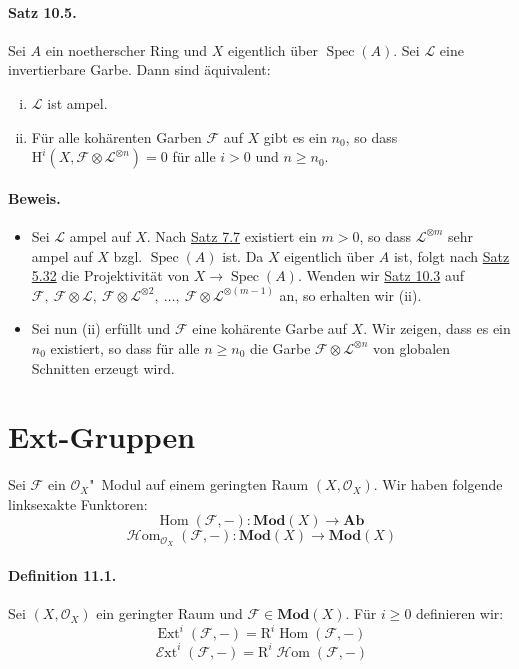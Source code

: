 \paragraph{Satz 10.5.}\label{10.5} Sei $A$ ein noetherscher Ring und $X$ eigentlich über $\operatorname{Spec}(A)$. Sei $\mathcal{L}$ eine invertierbare Garbe. Dann sind äquivalent:
\begin{enumerate}[(i)]
\item $\mathcal{L}$ ist ampel.
\item Für alle kohärenten Garben $\mathcal{F}$ auf $X$ gibt es ein $n_0$, so dass $\mathrm{H}^i(X,\mathcal{F}\otimes \mathcal{L}^{\otimes n})=0$ für alle $i>0$ und $n\geq n_0$.
\end{enumerate}

\paragraph{Beweis.} \begin{itemize}
\item Sei $\mathcal{L}$ ampel auf $X$. Nach \hyperref[7.7]{Satz 7.7} existiert ein $m>0$, so dass $\mathcal{L}^{\otimes m}$ sehr ampel auf $X$ bzgl. $\operatorname{Spec}(A)$ ist. Da $X$ eigentlich über $A$ ist, folgt nach \hyperref[5.32]{Satz 5.32} die Projektivität von $X\to\operatorname{Spec}(A)$. Wenden wir \hyperref[10.3]{Satz 10.3} auf $\mathcal{F},\ \mathcal{F}\otimes\mathcal{L},\ \mathcal{F}\otimes\mathcal{L}^{\otimes 2},\ \ldots,\ \mathcal{F}\otimes\mathcal{L}^{\otimes (m-1)}$ an, so erhalten wir (ii).
\item Sei nun (ii) erfüllt und $\mathcal{F}$ eine kohärente Garbe auf $X$. Wir zeigen, dass es ein $n_0$ existiert, so dass für alle $n\geq n_0$ die Garbe $\mathcal{F}\otimes\mathcal{L}^{\otimes n}$ von globalen Schnitten erzeugt wird.
\end{itemize}

\section{Ext-Gruppen}

Sei $\mathcal{F}$ ein $\mathcal{O}_X$"~Modul auf einem geringten Raum $(X,\mathcal{O}_X)$. Wir haben folgende linksexakte Funktoren:
\[\operatorname{Hom}(\mathcal{F},-):\mathbf{Mod}(X)\to\mathbf{Ab} \]
\[\operatorname{\mathcal{H}om}_{\mathcal{O}_X}(\mathcal{F},-):\mathbf{Mod}(X)\to\mathbf{Mod}(X) \]

\paragraph{Definition 11.1.}\label{11.1} Sei $(X,\mathcal{O}_X)$ ein geringter Raum und $\mathcal{F}\in\mathbf{Mod}(X)$. Für $i\geq 0$ definieren wir:
\[\operatorname{Ext}^i(\mathcal{F},-)=\mathrm{R}^i\operatorname{Hom}(\mathcal{F},-) \]
\[\operatorname{\mathcal{E}xt}^i(\mathcal{F},-) =\mathrm{R}^i\operatorname{\mathcal{H}om}(\mathcal{F},-) \]

